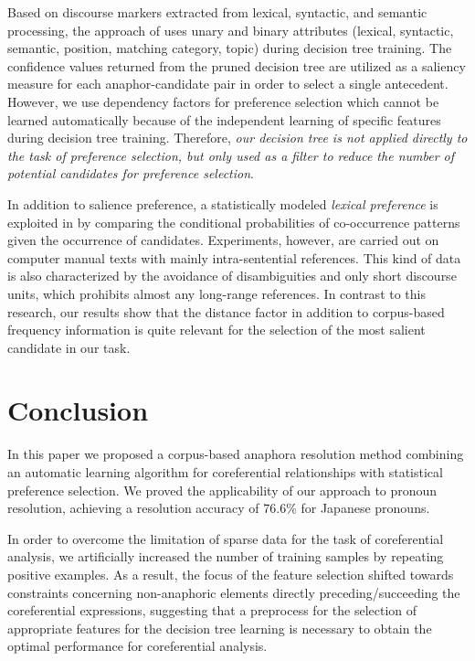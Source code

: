 Based on discourse markers extracted from lexical, syntactic, and semantic processing,
the approach of \cite{Aone95} uses unary and binary attributes (lexical, syntactic,
semantic, position, matching category, topic) during decision tree training. The confidence
values returned from the pruned decision tree are utilized as a saliency measure
for each anaphor-candidate pair in order to select a single antecedent.
However, we use dependency factors for preference selection which cannot be learned
automatically because of the independent learning of specific features during decision tree
training. Therefore, {\em our decision tree is not applied directly to the task of preference
selection, but only used as a filter to reduce the number of potential candidates for
preference selection}.

In addition to salience preference, a statistically modeled {\em lexical preference} is
exploited in \cite{Dagan95} by comparing the conditional probabilities of co-occurrence
patterns given the occurrence of candidates.
Experiments, however, are carried out on computer manual texts with mainly intra-sentential
references. This kind of data is also characterized by the avoidance of disambiguities
and only short discourse units, which prohibits almost any long-range references.
In contrast to this research, our results show that the distance factor in addition to
corpus-based frequency information is quite relevant for the selection of the most
salient candidate in our task.

\section{Conclusion}
\label{conc}

In this paper we proposed a corpus-based anaphora resolution method combining an automatic
learning algorithm for coreferential relationships with statistical preference selection.
We proved the applicability of our approach to pronoun resolution, achieving a resolution
accuracy of 76.6\% for Japanese pronouns.

In order to overcome the limitation of sparse data for the task of coreferential analysis,
we artificially increased the number of training samples by repeating positive examples.
As a result, the focus of the feature selection shifted towards constraints concerning non-anaphoric
elements directly preceding/succeeding the coreferential expressions, suggesting that a preprocess
for the selection of appropriate features for the decision tree learning is necessary to obtain
the optimal performance for coreferential analysis.

